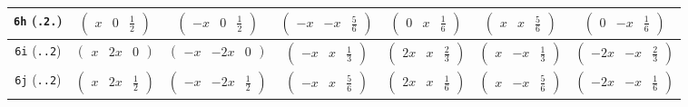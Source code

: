 \documentclass[fleqn,9pt,landscape]{jsarticle}
\begin{document}
\begin{center}
\begin{longtable}{ccccccc}
{\tt 6h} ({\tt .2.}) & $ \begin{pmatrix} x & 0 & \frac{1}{2} \end{pmatrix} $ & $ \begin{pmatrix} - x & 0 & \frac{1}{2} \end{pmatrix} $ & $ \begin{pmatrix} - x & - x & \frac{5}{6} \end{pmatrix} $ & $ \begin{pmatrix} 0 & x & \frac{1}{6} \end{pmatrix} $ & $ \begin{pmatrix} x & x & \frac{5}{6} \end{pmatrix} $ & $ \begin{pmatrix} 0 & - x & \frac{1}{6} \end{pmatrix} $ \\ \hline
{\tt 6i} ({\tt ..2}) & $ \begin{pmatrix} x & 2 x & 0 \end{pmatrix} $ & $ \begin{pmatrix} - x & - 2 x & 0 \end{pmatrix} $ & $ \begin{pmatrix} - x & x & \frac{1}{3} \end{pmatrix} $ & $ \begin{pmatrix} 2 x & x & \frac{2}{3} \end{pmatrix} $ & $ \begin{pmatrix} x & - x & \frac{1}{3} \end{pmatrix} $ & $ \begin{pmatrix} - 2 x & - x & \frac{2}{3} \end{pmatrix} $ \\ \hline
{\tt 6j} ({\tt ..2}) & $ \begin{pmatrix} x & 2 x & \frac{1}{2} \end{pmatrix} $ & $ \begin{pmatrix} - x & - 2 x & \frac{1}{2} \end{pmatrix} $ & $ \begin{pmatrix} - x & x & \frac{5}{6} \end{pmatrix} $ & $ \begin{pmatrix} 2 x & x & \frac{1}{6} \end{pmatrix} $ & $ \begin{pmatrix} x & - x & \frac{5}{6} \end{pmatrix} $ & $ \begin{pmatrix} - 2 x & - x & \frac{1}{6} \end{pmatrix} $ \\ \hline

\end{longtable}
\end{center}
\end{document}
